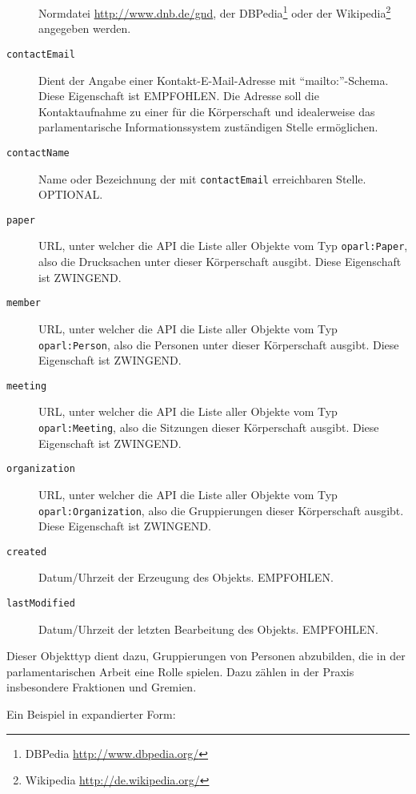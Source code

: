 \documentclass[,a4paper]{article}
\begin{document}
\begin{description}
{  Normdatei \url{http://www.dnb.de/gnd}}, der DBPedia\footnote{DBPedia
  \url{http://www.dbpedia.org/}} oder der Wikipedia\footnote{Wikipedia
  \url{http://de.wikipedia.org/}} angegeben werden.
\item[\texttt{contactEmail}]
Dient der Angabe einer Kontakt-E-Mail-Adresse mit ``mailto:''-Schema.
Diese Eigenschaft ist EMPFOHLEN. Die Adresse soll die Kontaktaufnahme zu
einer für die Körperschaft und idealerweise das parlamentarische
Informationssystem zuständigen Stelle ermöglichen.
\item[\texttt{contactName}]
Name oder Bezeichnung der mit \texttt{contactEmail} erreichbaren Stelle.
OPTIONAL.
\item[\texttt{paper}]
URL, unter welcher die API die Liste aller Objekte vom Typ
\texttt{oparl:Paper}, also die Drucksachen unter dieser Körperschaft
ausgibt. Diese Eigenschaft ist ZWINGEND.
\item[\texttt{member}]
URL, unter welcher die API die Liste aller Objekte vom Typ
\texttt{oparl:Person}, also die Personen unter dieser Körperschaft
ausgibt. Diese Eigenschaft ist ZWINGEND.
\item[\texttt{meeting}]
URL, unter welcher die API die Liste aller Objekte vom Typ
\texttt{oparl:Meeting}, also die Sitzungen dieser Körperschaft ausgibt.
Diese Eigenschaft ist ZWINGEND.
\item[\texttt{organization}]
URL, unter welcher die API die Liste aller Objekte vom Typ
\texttt{oparl:Organization}, also die Gruppierungen dieser Körperschaft
ausgibt. Diese Eigenschaft ist ZWINGEND.
\item[\texttt{created}]
Datum/Uhrzeit der Erzeugung des Objekts. EMPFOHLEN.
\item[\texttt{lastModified}]
Datum/Uhrzeit der letzten Bearbeitung des Objekts. EMPFOHLEN.
\end{description}


Dieser Objekttyp dient dazu, Gruppierungen von Personen abzubilden, die
in der parlamentarischen Arbeit eine Rolle spielen. Dazu zählen in der
Praxis insbesondere Fraktionen und Gremien.

Ein Beispiel in expandierter Form:
\end{document}
